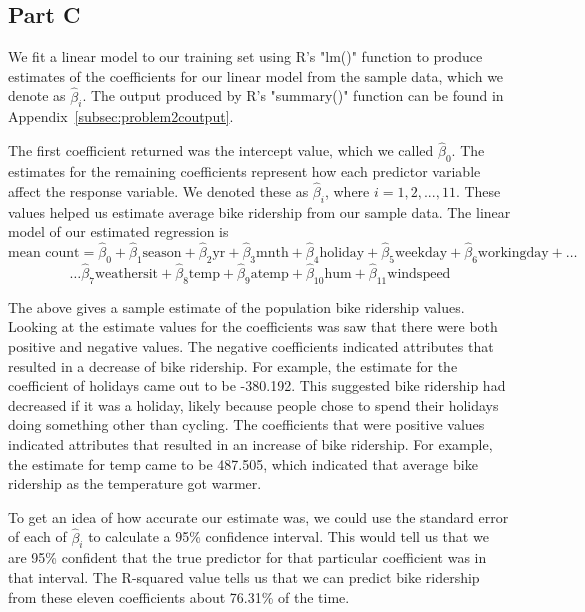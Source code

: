\documentclass[11pt]{article}
\begin{document}
\subsection{Part C}
\label{subsec:2c}
We fit a linear model to our training set using R's "lm()" function to produce estimates of the coefficients for our linear model from the sample data, which we denote as $\hat{\beta}_{i}$. The output produced by R's "summary()" function can be found in Appendix~\ref{subsec:problem2coutput}.

The first coefficient returned was the intercept value, which we called $\hat{\beta}_{0}$. The estimates for the remaining coefficients represent how each predictor variable affect the response variable. We denoted these as $\hat{\beta}_{i}$, where $i=1,2,...,11$. These values helped us estimate average bike ridership from our sample data. The linear model of our estimated regression is
\begin{equation}
\text{mean count} = \hat{\beta}_0 + \hat{\beta}_1 \text{season} + \hat{\beta}_2 \text{yr} + \hat{\beta}_3\text{mnth} + \hat{\beta}_4\text{holiday} + \hat{\beta}_5\text{weekday} + \hat{\beta}_6\text{workingday} +  \dots
\end{equation}
\begin{equation}
\dots \hat{\beta}_7 \text{weathersit} + \hat{\beta}_8 \text{temp} + \hat{\beta}_9 \text{atemp} + \hat{\beta}_{10} \text{hum} + \hat{\beta}_{11} \text{windspeed}
\end{equation}

The above gives a sample estimate of the population bike ridership values. Looking at the estimate values for the coefficients was saw that there were both positive and negative values. The negative coefficients indicated attributes that resulted in a decrease of bike ridership. For example, the estimate for the coefficient of holidays came out to be -380.192. This suggested bike ridership had decreased if it was a holiday, likely because people chose to spend their holidays doing something other than cycling. The coefficients that were positive values indicated attributes that resulted in an increase of bike ridership. For example, the estimate for temp came to be 487.505, which indicated that average bike ridership as the temperature got warmer.

To get an idea of how accurate our estimate was, we could use the standard error of each of $\hat{\beta}_i$ to calculate a 95\% confidence interval. This would tell us that we are 95\% confident that the true predictor for that particular coefficient was in that interval. The R-squared value tells us that we can predict bike ridership from these eleven coefficients about 76.31\% of the time. 
\end{document}
